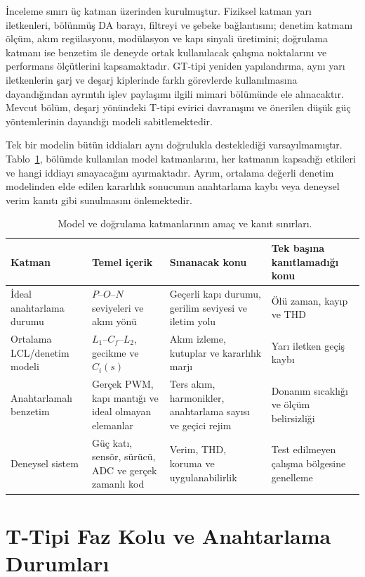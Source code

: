 İnceleme sınırı üç katman üzerinden kurulmuştur. Fiziksel katman yarı iletkenleri, bölünmüş DA barayı, filtreyi ve şebeke bağlantısını; denetim katmanı ölçüm, akım regülasyonu, modülasyon ve kapı sinyali üretimini; doğrulama katmanı ise benzetim ile deneyde ortak kullanılacak çalışma noktalarını ve performans ölçütlerini kapsamaktadır. GT-tipi yeniden yapılandırma, aynı yarı iletkenlerin şarj ve deşarj kiplerinde farklı görevlerde kullanılmasına dayandığından ayrıntılı işlev paylaşımı ilgili mimari bölümünde ele alınacaktır. Mevcut bölüm, deşarj yönündeki T-tipi evirici davranışını ve önerilen düşük güç yöntemlerinin dayandığı modeli sabitlemektedir.

Tek bir modelin bütün iddiaları aynı doğrulukla desteklediği varsayılmamıştır. Tablo~\ref{tab:model-katmanlari}, bölümde kullanılan model katmanlarını, her katmanın kapsadığı etkileri ve hangi iddiayı sınayacağını ayırmaktadır. Ayrım, ortalama değerli denetim modelinden elde edilen kararlılık sonucunun anahtarlama kaybı veya deneysel verim kanıtı gibi sunulmasını önlemektedir.

\begin{table}[htbp]
  \centering
  \caption{\juriistegietiketi\ Model ve doğrulama katmanlarının amaç ve kanıt sınırları.}
  \label{tab:model-katmanlari}
  \small
  \begin{tabularx}{\textwidth}{p{} p{} X X}
    \toprule
    Katman & Temel içerik & Sınanacak konu & Tek başına kanıtlamadığı konu \\
    \midrule
    İdeal anahtarlama durumu & $P$--$O$--$N$ seviyeleri ve akım yönü & Geçerli kapı durumu, gerilim seviyesi ve iletim yolu & Ölü zaman, kayıp ve THD \\
    Ortalama LCL/denetim modeli & $L_1$--$C_f$--$L_2$, gecikme ve $C_i(s)$ & Akım izleme, kutuplar ve kararlılık marjı & Yarı iletken geçiş kaybı \\
    Anahtarlamalı benzetim & Gerçek PWM, kapı mantığı ve ideal olmayan elemanlar & Ters akım, harmonikler, anahtarlama sayısı ve geçici rejim & Donanım sıcaklığı ve ölçüm belirsizliği \\
    Deneysel sistem & Güç katı, sensör, sürücü, ADC ve gerçek zamanlı kod & Verim, THD, koruma ve uygulanabilirlik & Test edilmeyen çalışma bölgesine genelleme \\
    \bottomrule
  \end{tabularx}
\end{table}

\section{T-Tipi Faz Kolu ve Anahtarlama Durumları}

